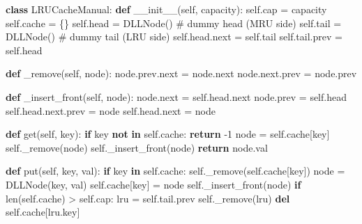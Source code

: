 \documentclass[11pt]{article}
\newenvironment{Shaded}{\begin{snugshade}}{\end{snugshade}}
\newcommand{\BuiltInTok}[1]{\textcolor[rgb]{0.50,0.55,0.55}{#1}}
\newcommand{\CommentTok}[1]{\textcolor[rgb]{0.48,0.49,0.49}{#1}}
\newcommand{\ControlFlowTok}[1]{\textcolor[rgb]{0.99,0.74,0.29}{\textbf{#1}}}
\newcommand{\DecValTok}[1]{\textcolor[rgb]{0.96,0.45,0.00}{#1}}
\newcommand{\FunctionTok}[1]{\textcolor[rgb]{0.56,0.27,0.68}{#1}}
\newcommand{\KeywordTok}[1]{\textcolor[rgb]{0.81,0.81,0.76}{\textbf{#1}}}
\newcommand{\NormalTok}[1]{\textcolor[rgb]{0.81,0.81,0.76}{#1}}
\newcommand{\OperatorTok}[1]{\textcolor[rgb]{0.81,0.81,0.76}{#1}}
\newcommand{\VariableTok}[1]{\textcolor[rgb]{0.15,0.68,0.68}{#1}}
\begin{document}
\begin{Shaded}
\begin{Highlighting}[]
\KeywordTok{class}\NormalTok{ LRUCacheManual:}
    \KeywordTok{def} \FunctionTok{\_\_init\_\_}\NormalTok{(}\VariableTok{self}\NormalTok{, capacity):}
        \VariableTok{self}\NormalTok{.cap }\OperatorTok{=}\NormalTok{ capacity}
        \VariableTok{self}\NormalTok{.cache }\OperatorTok{=}\NormalTok{ \{\}}
        \VariableTok{self}\NormalTok{.head }\OperatorTok{=}\NormalTok{ DLLNode()   }\CommentTok{\# dummy head (MRU side)}
        \VariableTok{self}\NormalTok{.tail }\OperatorTok{=}\NormalTok{ DLLNode()   }\CommentTok{\# dummy tail (LRU side)}
        \VariableTok{self}\NormalTok{.head.}\BuiltInTok{next} \OperatorTok{=} \VariableTok{self}\NormalTok{.tail}
        \VariableTok{self}\NormalTok{.tail.prev }\OperatorTok{=} \VariableTok{self}\NormalTok{.head}

    \KeywordTok{def}\NormalTok{ \_remove(}\VariableTok{self}\NormalTok{, node):}
\NormalTok{        node.prev.}\BuiltInTok{next} \OperatorTok{=}\NormalTok{ node.}\BuiltInTok{next}
\NormalTok{        node.}\BuiltInTok{next}\NormalTok{.prev }\OperatorTok{=}\NormalTok{ node.prev}

    \KeywordTok{def}\NormalTok{ \_insert\_front(}\VariableTok{self}\NormalTok{, node):}
\NormalTok{        node.}\BuiltInTok{next} \OperatorTok{=} \VariableTok{self}\NormalTok{.head.}\BuiltInTok{next}
\NormalTok{        node.prev }\OperatorTok{=} \VariableTok{self}\NormalTok{.head}
        \VariableTok{self}\NormalTok{.head.}\BuiltInTok{next}\NormalTok{.prev }\OperatorTok{=}\NormalTok{ node}
        \VariableTok{self}\NormalTok{.head.}\BuiltInTok{next} \OperatorTok{=}\NormalTok{ node}

    \KeywordTok{def}\NormalTok{ get(}\VariableTok{self}\NormalTok{, key):}
        \ControlFlowTok{if}\NormalTok{ key }\KeywordTok{not} \KeywordTok{in} \VariableTok{self}\NormalTok{.cache: }\ControlFlowTok{return} \OperatorTok{{-}}\DecValTok{1}
\NormalTok{        node }\OperatorTok{=} \VariableTok{self}\NormalTok{.cache[key]}
        \VariableTok{self}\NormalTok{.\_remove(node)}
        \VariableTok{self}\NormalTok{.\_insert\_front(node)}
        \ControlFlowTok{return}\NormalTok{ node.val}

    \KeywordTok{def}\NormalTok{ put(}\VariableTok{self}\NormalTok{, key, val):}
        \ControlFlowTok{if}\NormalTok{ key }\KeywordTok{in} \VariableTok{self}\NormalTok{.cache:}
            \VariableTok{self}\NormalTok{.\_remove(}\VariableTok{self}\NormalTok{.cache[key])}
\NormalTok{        node }\OperatorTok{=}\NormalTok{ DLLNode(key, val)}
        \VariableTok{self}\NormalTok{.cache[key] }\OperatorTok{=}\NormalTok{ node}
        \VariableTok{self}\NormalTok{.\_insert\_front(node)}
        \ControlFlowTok{if} \BuiltInTok{len}\NormalTok{(}\VariableTok{self}\NormalTok{.cache) }\OperatorTok{\textgreater{}} \VariableTok{self}\NormalTok{.cap:}
\NormalTok{            lru }\OperatorTok{=} \VariableTok{self}\NormalTok{.tail.prev}
            \VariableTok{self}\NormalTok{.\_remove(lru)}
            \KeywordTok{del} \VariableTok{self}\NormalTok{.cache[lru.key]}
\end{Highlighting}
\end{Shaded}
\end{document}
